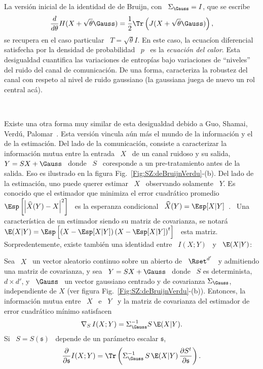 La versi\'on  inicial de la identidad de  de Bruijn, con \  $\Sigma_\Gauss = I$,
que se escribe
%
\[
\frac{d}{d\theta}     H(X+\sqrt{\theta}    \Gauss)    =     \frac12    \Tr\left(
  J(X+\sqrt{\theta} \Gauss) \right),
\]
%
se recupera  en el caso particular  \ $T =  \sqrt{\theta} I$.  En este  caso, la
ecuac\'ion diferencial satisfecha por la densidad  de probabilidad \ $p$ \ es la
{\it  ecuaci\'on del  calor}.  Esta  desigualdad cuantifica  las  variaciones de
entrop\'ias   bajo  variaciones   de  ``niveles''   del  ruido   del   canal  de
comunicaci\'on. De una  forma, caracteriza la robustez del  canal con respeto al
nivel de ruido gaussiano (la gaussiana juega de nuevo un rol central ac\'a).

\

Existe una  otra forma  muy similar  de esta desigualdad  debido a  Guo, Shamai,
Verd\'u,  Palomar~\cite{GuoSha05, PalVer06,  TorZoz18}.  Esta  versi\'on vincula
a\'un m\'as el mundo  de la informaci\'on y el de la  estimaci\'on.  Del lado de
la  comunicaci\'on, consiste  a  caracterizar la  informaci\'on  mutua entre  la
entrada \ $X$ \ de un canal ruidoso y su  salida, \ $Y = S X + \Gauss$ \ donde \
$S$ \ coresponde a un pre-tratamiento antes de la salida. Eso es ilustrado en la
figura  Fig.~\ref{Fig:SZ:deBruijnVerdu}-(b).  Del lado  de la  estimaci\'on, uno
puede querer  estimar \ $X$  \ observando solamente  \ $Y$.  Es conocido  que el
estimador  que minimiza  el error  cuadr\'atico promedio  \  $\Esp\left[ \left|
    \widehat{X}(Y)  - X  \right|^2 \right]$  \  es la  esperanza condicional  \
$\widehat{X}(Y)   =    \Esp[X|Y]$~\cite{Kay93,   Rob07,   LehCas98}.     \   Una
caracter\'istica de un  estimador siendo su matriz de  covarianza, se notar\'a \
$\E(X|Y)  =  \Esp\left[  \left( X  -  \Esp[X|Y]  \right)  \left( X  -  \Esp[X|Y]
  \right)^t  \right]$ \  esta  matriz.  Sorpredentemente,  existe tambi\'en  una
identidad entre \ $I(X;Y)$ \ y \ $\E(X|Y)$:
%
\begin{teorema}[Identidad de Guo--Shamai--Verd\'u]
  Sea \ $X$ \ un vector aleatorio  continuo sobre un abierto de \ $\Rset^{d'}$ \
  y admitiendo una  matriz de covarianza, y sea \  $Y = S X +  \Gauss$ \ donde \
  $S$  es determinista,  $d  \times d'$,  y  \ $\Gauss$  \  un vector  gaussiano
  centrado  y de covarianza  $\Sigma_\Gauss$, independiente  de $X$  (ver figura
  Fig.~\ref{Fig:SZ:deBruijnVerdu}-(b)). Entonces, la informaci\'on mutua entre \
  $X$ \ e \ $Y$ \ y  la matriz de covarianza del estimador de error cuadr\'atico
  m\'inimo satisfacen
  \[
  \nabla_S \, I(X;Y) = \Sigma_\Gauss^{-1} S \, \E(X|Y).
  \]
  Si \ $S = S(\mathfrak{s})$ \ depende de un par\'ametro escalar $\mathfrak{s}$,
  \[
  \frac{\partial}{\partial \mathfrak{s}} I(X;Y) = \Tr\left( \Sigma_\Gauss^{-1} \, S \,
    \E(X|Y) \, \frac{\partial S^t}{\partial \mathfrak{s}} \right).
  \]
\end{teorema}
